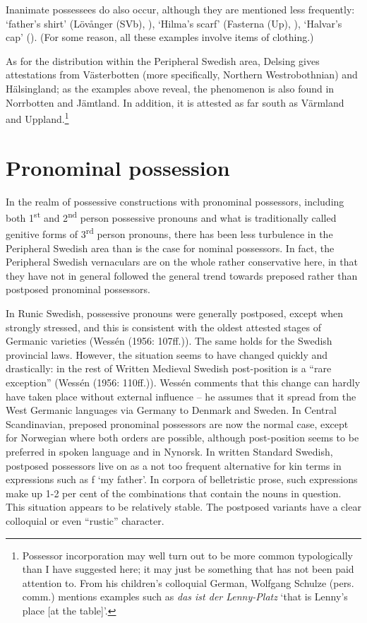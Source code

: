 Inanimate possessees do also occur, although they are mentioned less frequently:  ‘father’s shirt’ (Lövånger (SVb), \citet{Holm1942}),  ‘Hilma’s scarf’ (Fasterna (Up), \citet[134]{Tiselius1902}),  ‘Halvar’s cap’ (\citet{Oscarsson2007}). (For some reason, all these examples involve items of clothing.)

As for the distribution within the Peripheral Swedish area, Delsing gives attestations from Västerbotten (more specifically, Northern Westrobothnian) and Hälsingland; as the examples above reveal, the phenomenon is also found in Norrbotten and Jämtland. In addition, it is attested as far south as Värmland and Uppland.\footnote{ Possessor incorporation may well turn out to be more common typologically than I have suggested here; it may just be something that has not been paid attention to. From his children’s colloquial German, Wolfgang Schulze (pers. comm.) mentions examples such as \textit{das ist der Lenny-Platz} ‘that is Lenny’s place [at the table]’.\par }

\section{Pronominal possession}

In the realm of possessive constructions with pronominal possessors, including both 1\textsuperscript{st} and 2\textsuperscript{nd} person possessive pronouns and what is traditionally called genitive forms of 3\textsuperscript{rd} person pronouns, there has been less turbulence in the Peripheral Swedish area than is the case for nominal possessors. In fact, the Peripheral Swedish vernaculars are on the whole rather conservative here, in that they have not in general followed the general trend towards preposed rather than postposed pronominal possessors. 

In Runic Swedish, possessive pronouns were generally postposed, except when strongly stressed, and this is consistent with the oldest attested stages of Germanic varieties (Wessén (1956: 107ff.)). The same holds for the Swedish provincial laws. However, the situation seems to have changed quickly and drastically: in the rest of Written Medieval Swedish post-position is a “rare exception” (Wessén (1956: 110ff.)). Wessén comments that this change can hardly have taken place without external influence – he assumes that it spread from the West Germanic languages via Germany to Denmark and Sweden. In Central Scandinavian, preposed pronominal possessors are now the normal case, except for Norwegian where both orders are possible, although post-position seems to be preferred in spoken language and in Nynorsk. In written Standard Swedish, postposed possessors live on as a not too frequent alternative for kin terms in expressions such as f ‘my father’. In corpora of belletristic prose, such expressions make up 1-2 per cent of the combinations that contain the nouns in question. This situation appears to be relatively stable. The postposed variants have a clear colloquial or even “rustic” character. 

